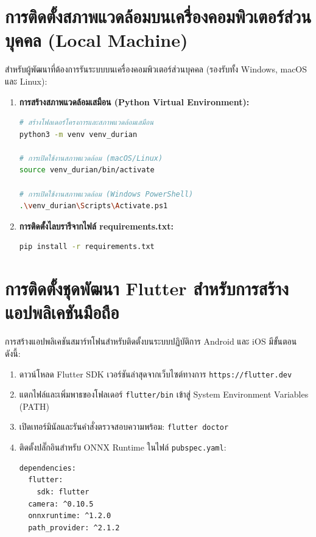 \section{การติดตั้งสภาพแวดล้อมบนเครื่องคอมพิวเตอร์ส่วนบุคคล (Local Machine)}
สำหรับผู้พัฒนาที่ต้องการรันระบบบนเครื่องคอมพิวเตอร์ส่วนบุคคล (รองรับทั้ง Windows, macOS และ Linux):

\begin{enumerate}[leftmargin=1.8em, itemsep=4pt]
    \item \textbf{การสร้างสภาพแวดล้อมเสมือน (Python Virtual Environment):}
\begin{lstlisting}[language=bash]
# สร้างโฟลเดอร์โครงการและสภาพแวดล้อมเสมือน
python3 -m venv venv_durian

# การเปิดใช้งานสภาพแวดล้อม (macOS/Linux)
source venv_durian/bin/activate

# การเปิดใช้งานสภาพแวดล้อม (Windows PowerShell)
.\venv_durian\Scripts\Activate.ps1
\end{lstlisting}

    \item \textbf{การติดตั้งไลบรารีจากไฟล์ requirements.txt:}
\begin{lstlisting}[language=bash]
pip install -r requirements.txt
\end{lstlisting}
\end{enumerate}

\section{การติดตั้งชุดพัฒนา Flutter สำหรับการสร้างแอปพลิเคชันมือถือ}
การสร้างแอปพลิเคชันสมาร์ทโฟนสำหรับติดตั้งบนระบบปฏิบัติการ Android และ iOS มีขั้นตอนดังนี้:
\begin{enumerate}[leftmargin=1.8em, itemsep=3pt]
    \item ดาวน์โหลด Flutter SDK เวอร์ชันล่าสุดจากเว็บไซต์ทางการ \texttt{https://flutter.dev}
    \item แตกไฟล์และเพิ่มพาธของโฟลเดอร์ \texttt{flutter/bin} เข้าสู่ System Environment Variables (PATH)
    \item เปิดเทอร์มินัลและรันคำสั่งตรวจสอบความพร้อม: \texttt{flutter doctor}
    \item ติดตั้งปลั๊กอินสำหรับ ONNX Runtime ในไฟล์ \texttt{pubspec.yaml}:
\begin{lstlisting}[language=bash]
dependencies:
  flutter:
    sdk: flutter
  camera: ^0.10.5
  onnxruntime: ^1.2.0
  path_provider: ^2.1.2
\end{lstlisting}
\end{enumerate}
